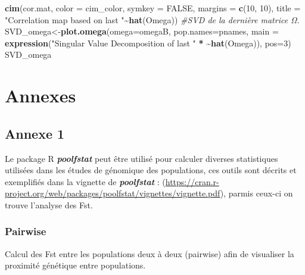 \documentclass[
  openany]{book}
\newenvironment{Shaded}{\begin{snugshade}}{\end{snugshade}}
\newcommand{\AttributeTok}[1]{\textcolor[rgb]{0.13,0.29,0.53}{#1}}
\newcommand{\CommentTok}[1]{\textcolor[rgb]{0.56,0.35,0.01}{\textit{#1}}}
\newcommand{\ConstantTok}[1]{\textcolor[rgb]{0.56,0.35,0.01}{#1}}
\newcommand{\DecValTok}[1]{\textcolor[rgb]{0.00,0.00,0.81}{#1}}
\newcommand{\ErrorTok}[1]{\textcolor[rgb]{0.64,0.00,0.00}{\textbf{#1}}}
\newcommand{\FunctionTok}[1]{\textcolor[rgb]{0.13,0.29,0.53}{\textbf{#1}}}
\newcommand{\NormalTok}[1]{#1}
\newcommand{\OtherTok}[1]{\textcolor[rgb]{0.56,0.35,0.01}{#1}}
\newcommand{\SpecialCharTok}[1]{\textcolor[rgb]{0.81,0.36,0.00}{\textbf{#1}}}
\newcommand{\StringTok}[1]{\textcolor[rgb]{0.31,0.60,0.02}{#1}}
\theoremstyle{definition}
\theoremstyle{definition}
\theoremstyle{definition}
\theoremstyle{definition}
\theoremstyle{remark}
\begin{document}
\begin{Shaded}
\begin{Highlighting}[]
\FunctionTok{cim}\NormalTok{(cor.mat, }\AttributeTok{color =}\NormalTok{ cim\_color, }\AttributeTok{symkey =} \ConstantTok{FALSE}\NormalTok{, }\AttributeTok{margins =} \FunctionTok{c}\NormalTok{(}\DecValTok{10}\NormalTok{, }\DecValTok{10}\NormalTok{), }\AttributeTok{title =} \StringTok{"Correlation map based on last "}\SpecialCharTok{\textasciitilde{}}\FunctionTok{hat}\NormalTok{(Omega))}
\CommentTok{\#SVD de la dernière matrice Ω.}
\NormalTok{SVD\_omega}\OtherTok{\textless{}{-}}\FunctionTok{plot.omega}\NormalTok{(}\AttributeTok{omega=}\NormalTok{omegaB, }\AttributeTok{pop.names=}\NormalTok{pnames, }\AttributeTok{main =} \FunctionTok{expression}\NormalTok{(}\StringTok{"Singular Value Decomposition of last "} \SpecialCharTok{*} \ErrorTok{\textasciitilde{}}\FunctionTok{hat}\NormalTok{(Omega)), }\AttributeTok{pos=}\DecValTok{3}\NormalTok{)}
\NormalTok{SVD\_omega}
\end{Highlighting}
\end{Shaded}

\hypertarget{annexes}{%
\chapter*{Annexes}\label{annexes}}

\hypertarget{An1}{%
\section*{Annexe 1}\label{An1}}

Le package R \textbf{\emph{poolfstat}} peut être utilisé pour calculer diverses statistiques utilisées dans les études de génomique des populations, ces outils sont décrits et exemplifiés dans la vignette de \textbf{\emph{poolfstat}} : (\url{https://cran.r-project.org/web/packages/poolfstat/vignettes/vignette.pdf}), parmis ceux-ci on trouve l'analyse des Fst.

\hypertarget{pairwise}{%
\subsection*{Pairwise}\label{pairwise}}

Calcul des Fst entre les populations deux à deux (pairwise) afin de visualiser la proximité génétique entre populations.
\end{document}
